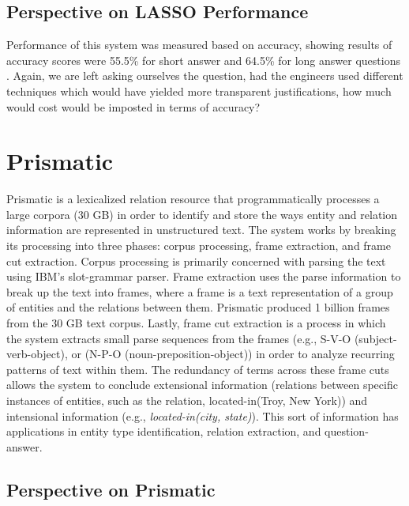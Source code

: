 \subsection{Perspective on LASSO Performance}

Performance of this system was measured based on accuracy, showing results of accuracy scores were 55.5\% for short answer and 64.5\% for long answer questions \cite{moldovan_1999}.  Again, we are left asking ourselves the question, had the engineers used different techniques which would have yielded more transparent justifications, how much would cost would be imposted in terms of accuracy? 

\section{Prismatic}

Prismatic \cite{fan2012automatic} is a lexicalized relation resource that programmatically processes a large corpora (30 GB) in order to identify and store the ways entity and relation information are represented in unstructured text.  The system works by breaking its processing into
three phases:  corpus processing, frame extraction, and frame cut extraction.  Corpus processing is primarily concerned with parsing the text using IBM's slot-grammar parser.  Frame extraction uses the parse information to break up the text into frames, where a frame is a text representation of a group of entities and the relations between them.  Prismatic produced 1 billion frames from the 30 GB text corpus.  Lastly, frame cut extraction is a process in which the system extracts small parse sequences from the frames (e.g., S-V-O (subject-verb-object), or
(N-P-O (noun-preposition-object)) in order to analyze recurring patterns of text within them.  The redundancy of terms across these frame cuts allows the system to conclude extensional information (relations between specific instances of entities, such as the relation, located-in(Troy, New York)) and intensional information (e.g., \textit{located-in(city, state)}).  This sort of information has applications in entity type identification, relation extraction, and question-answer.

\subsection{Perspective on Prismatic}

